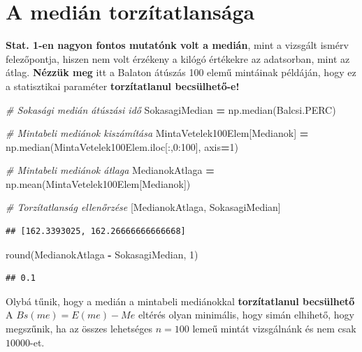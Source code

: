 \documentclass[
]{book}
\newenvironment{Shaded}{\begin{snugshade}}{\end{snugshade}}
\newcommand{\BuiltInTok}[1]{#1}
\newcommand{\CommentTok}[1]{\textcolor[rgb]{0.56,0.35,0.01}{\textit{#1}}}
\newcommand{\DecValTok}[1]{\textcolor[rgb]{0.00,0.00,0.81}{#1}}
\newcommand{\NormalTok}[1]{#1}
\newcommand{\OperatorTok}[1]{\textcolor[rgb]{0.81,0.36,0.00}{\textbf{#1}}}
\newcommand{\StringTok}[1]{\textcolor[rgb]{0.31,0.60,0.02}{#1}}
\begin{document}
\section{A medián torzítatlansága}\label{a-mediuxe1n-torzuxedtatlansuxe1ga}

\textbf{Stat. 1-en nagyon fontos mutatónk volt a medián}, mint a vizsgált ismérv felezőpontja, hiszen nem volt érzékeny a kilógó értékekre az adatsorban, mint az átlag. \textbf{Nézzük meg} itt a Balaton átúszás 100 elemű mintáinak példáján, hogy ez a statisztikai paraméter \textbf{torzítatlanul becsülhető-e!}

\begin{Shaded}
\begin{Highlighting}[]
\CommentTok{\# Sokasági medián átúszási idő}
\NormalTok{SokasagiMedian }\OperatorTok{=}\NormalTok{ np.median(Balcsi.PERC)}

\CommentTok{\# Mintabeli mediánok kiszámítása}
\NormalTok{MintaVetelek100Elem[}\StringTok{\textquotesingle{}Medianok\textquotesingle{}}\NormalTok{] }\OperatorTok{=}\NormalTok{ np.median(MintaVetelek100Elem.iloc[:,}\DecValTok{0}\NormalTok{:}\DecValTok{100}\NormalTok{], axis}\OperatorTok{=}\DecValTok{1}\NormalTok{)}

\CommentTok{\# Mintabeli mediánok átlaga}
\NormalTok{MedianokAtlaga }\OperatorTok{=}\NormalTok{ np.mean(MintaVetelek100Elem[}\StringTok{\textquotesingle{}Medianok\textquotesingle{}}\NormalTok{])}

\CommentTok{\# Torzítatlanság ellenőrzése}
\NormalTok{[MedianokAtlaga, SokasagiMedian]}
\end{Highlighting}
\end{Shaded}

\begin{verbatim}
## [162.3393025, 162.26666666666668]
\end{verbatim}

\begin{Shaded}
\begin{Highlighting}[]
\BuiltInTok{round}\NormalTok{(MedianokAtlaga }\OperatorTok{{-}}\NormalTok{ SokasagiMedian, }\DecValTok{1}\NormalTok{)}
\end{Highlighting}
\end{Shaded}

\begin{verbatim}
## 0.1
\end{verbatim}

Olybá tűnik, hogy a medián a mintabeli mediánokkal \textbf{torzítatlanul becsülhető} A \(Bs(me) = E(me) - Me\) eltérés olyan minimális, hogy simán elhihető, hogy megszűnik, ha az összes lehetséges \(n=100\) lemeű mintát vizsgálnánk és nem csak \(10000\)-et.
\end{document}

